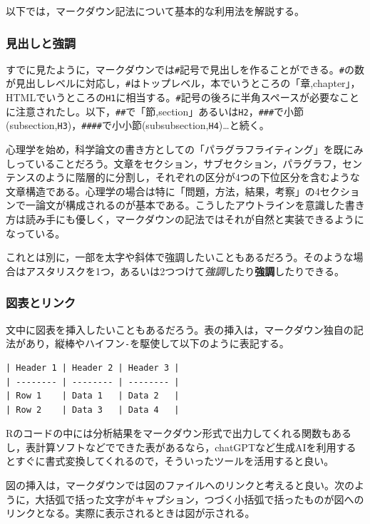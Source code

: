 \documentclass[
  a4paper,
]{ltjsbook}
\begin{document}
以下では，マークダウン記法について基本的な利用法を解説する。

\subsubsection{見出しと強調}\label{ux898bux51faux3057ux3068ux5f37ux8abf}

すでに見たように，マークダウンでは\texttt{\#}記号で見出しを作ることができる。\texttt{\#}の数が見出しレベルに対応し，\texttt{\#}はトップレベル，本でいうところの「章,chapter」，HTMLでいうところの\texttt{H1}に相当する。\texttt{\#}記号の後ろに半角スペースが必要なことに注意されたし。以下，\texttt{\#\#}で「節,section」あるいは\texttt{H2}，\texttt{\#\#\#}で小節(subsection,\texttt{H3})，\texttt{\#\#\#\#}で小小節(subsubsection,\texttt{H4})\ldots と続く。

心理学を始め，科学論文の書き方としての「パラグラフライティング」を既にみしっていることだろう。文章をセクション，サブセクション，パラグラフ，センテンスのように階層的に分割し，それぞれの区分が4つの下位区分を含むような文章構造である。心理学の場合は特に「問題，方法，結果，考察」の4セクションで一論文が構成されるのが基本である。こうしたアウトラインを意識した書き方は読み手にも優しく，マークダウンの記法ではそれが自然と実装できるようになっている。

これとは別に，一部を太字や斜体で強調したいこともあるだろう。そのような場合はアスタリスクを1つ，あるいは2つつけて\emph{強調}したり\textbf{強調}したりできる。

\subsubsection{図表とリンク}\label{ux56f3ux8868ux3068ux30eaux30f3ux30af}

文中に図表を挿入したいこともあるだろう。表の挿入は，マークダウン独自の記法があり，縦棒\texttt{\textbar{}}やハイフン\texttt{-}を駆使して以下のように表記する。

\begin{verbatim}
| Header 1 | Header 2 | Header 3 |
| -------- | -------- | -------- |
| Row 1    | Data 1   | Data 2   |
| Row 2    | Data 3   | Data 4   |
\end{verbatim}

Rのコードの中には分析結果をマークダウン形式で出力してくれる関数もあるし，表計算ソフトなどでできた表があるなら，chatGPTなど生成AIを利用するとすぐに書式変換してくれるので，そういったツールを活用すると良い。

図の挿入は，マークダウンでは図のファイルへのリンクと考えると良い。次のように，大括弧で括った文字がキャプション，つづく小括弧で括ったものが図へのリンクとなる。実際に表示されるときは図が示される。
\end{document}
